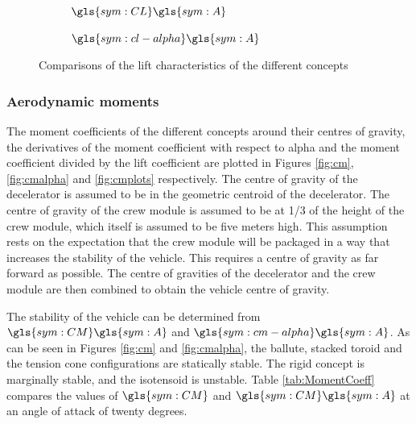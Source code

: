 \begin{figure}[h]
	\centering
	\begin{subfigure}[b]{0.49\textwidth}
		\setlength{} 
		\setlength{}
		
		\caption{$\gls{sym:CL}\gls{sym:A}$}
		\label{fig:cl}
	\end{subfigure}
	\begin{subfigure}[b]{0.49\textwidth}
		\setlength{} 
		\setlength{}
		
		\caption{$\gls{sym:cl-alpha}\gls{sym:A}$}
		\label{fig:claplha}
	\end{subfigure}
	\caption{Comparisons of the lift characteristics of the different concepts}
	\label{fig:clplots}
\end{figure}

\subsubsection{Aerodynamic moments}
\label{sec:AeroMom}
The moment coefficients of the different concepts around their centres of gravity, the derivatives of the moment coefficient with respect to alpha and the moment coefficient divided by the lift coefficient are plotted in Figures \ref{fig:cm}, \ref{fig:cmalpha} and \ref{fig:cmplots} respectively. The centre of gravity of the decelerator is assumed to be in the geometric centroid of the decelerator. The centre of gravity of the crew module is assumed to be at 1/3 of the height of the crew module, which itself is assumed to be five meters high. This assumption rests on the expectation that the crew module will be packaged in a way that increases the stability of the vehicle. This requires a centre of gravity as far forward as possible. The centre of gravities of the decelerator and the crew module are then combined to obtain the vehicle centre of gravity. 

The stability of the vehicle can be determined from $\gls{sym:CM}\gls{sym:A}$ and $\gls{sym:cm-alpha}\gls{sym:A}$. As can be seen in Figures \ref{fig:cm} and \ref{fig:cmalpha}, the ballute, stacked toroid and the tension cone configurations are statically stable. The rigid concept is marginally stable, and the isotensoid is unstable. Table \ref{tab:MomentCoeff} compares the values of $\gls{sym:CM}$ and $\gls{sym:CM}\gls{sym:A}$ at an angle of attack of twenty degrees. 
 
